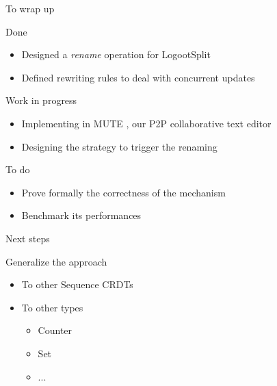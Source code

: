 \documentclass[10pt]{beamer}
\begin{document}
\begin{frame}{To wrap up}

  \begin{block}{Done}
    \begin{itemize}
      \item Designed a \emph{rename} operation for LogootSplit
      \item Defined rewriting rules to deal with concurrent updates
    \end{itemize}
  \end{block}

  \pause

  \begin{block}{Work in progress}
    \begin{itemize}
      \item Implementing in MUTE , our P2P collaborative text editor
      \item Designing the strategy to trigger the renaming
    \end{itemize}
  \end{block}

  \pause

  \begin{block}{To do}
    \begin{itemize}
      \item Prove formally the correctness of the mechanism
      \item Benchmark its performances
    \end{itemize}
  \end{block}
\end{frame}

\begin{frame}{Next steps}

  \begin{block}{Generalize the approach}
    \begin{itemize}
      \item<2-> To other Sequence \acp{CRDT}
      \item<3-> To other types
      \begin{itemize}
        \item Counter
        \item Set
        \item ...
      \end{itemize}
    \end{itemize}
  \end{block}
\end{frame}
\end{document}
